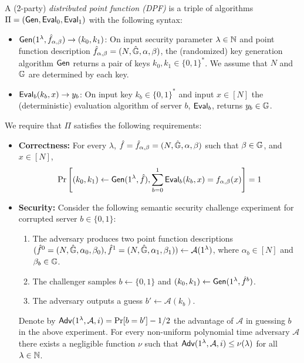 \iffalse
\begin{definition}\label{def:dpf}
A 
(2-party)
\emph{distributed point function (DPF)}
is a triple of algorithms %
$\Pi=({\sf Gen},{\sf Eval}_0,{\sf Eval}_1)$
with the following syntax: 
\begin{itemize}
    \item ${\sf Gen}(1^\lambda,\hat{f}_{\alpha,\beta})\rightarrow (k_0,k_1)$: On input security parameter $\lambda\in\mathbb{N}$ and point function description $\hat{f}_{\alpha,\beta}=(N,\hat{\mathbb{G}},\alpha,\beta)$, the (randomized) key generation algorithm ${\sf Gen}$ returns a pair of keys $k_0,k_1\in\{0,1\}^*$. 
    We assume that $N$ and $\mathbb{G}$ are determined by each key.
    \item ${\sf Eval}_b(k_b,x)\rightarrow y_b$: On input key $k_b\in\{0,1\}^*$ and input $x\in[N]$ the (deterministic) evaluation algorithm of server $b$, ${\sf Eval}_b$, returns 
    $y_b\in\mathbb{G}$.
\end{itemize}
We require that $\Pi$ satisfies the following requirements:
\begin{itemize}
    \item \textbf{Correctness:} For every $\lambda$, $\hat{f}=\hat{f}_{\alpha,\beta}=(N,\hat{\mathbb{G}},\alpha,\beta)$ such that $\beta\in\mathbb{G}$, and $x\in[N]$,   
    $$\Pr\left[(k_0,k_1)\leftarrow{\sf Gen}(1^\lambda,\hat{f}), \sum_{b=0}^{1}{\sf Eval}_b(k_b,x)=f_{\alpha,\beta}(x)\right]=1$$
    \item \textbf{Security:} Consider the following semantic security challenge experiment for corrupted server $b\in\{0,1\}$:
    \begin{enumerate}
        \item The adversary produces two point function descriptions $(\hat{f}^0=(N,\hat{\mathbb{G}},\alpha_0,\beta_0),\hat{f}^1=(N,\hat{\mathbb{G}},\alpha_1,\beta_1))\leftarrow\mathcal{A}(1^\lambda)$, where $\alpha_b\in[N]$ and $\beta_b\in\mathbb{G}$.
        \item The challenger samples $b\gets\{0,1\}$ and $(k_0,k_1)\leftarrow{\sf Gen}(1^\lambda,\hat{f}^b)$.
        \item The adversary outputs a guess $b'\leftarrow\mathcal{A}(k_b)$.
    \end{enumerate}
    Denote by ${\sf Adv}(1^\lambda,\mathcal{A},i)=\Pr[b=b']-1/2$ the advantage of $\mathcal{A}$ in guessing $b$ in the above experiment. For every non-uniform polynomial time adversary $\mathcal{A}$ there exists a negligible function $\nu$ such that ${\sf Adv}(1^\lambda,\mathcal{A},i) \le \nu(\lambda)$ for all $\lambda \in \mathbb{N}$.

\end{itemize}
\end{definition}
